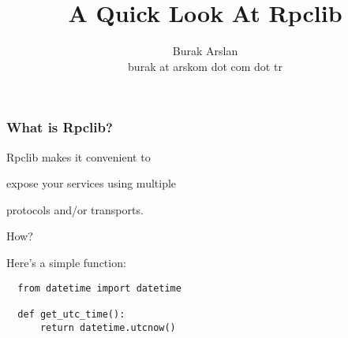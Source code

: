 \documentclass{beamer}
\title{A Quick Look At Rpclib}
\author{Burak Arslan \\ \small burak at arskom \small{dot} com \small{dot} tr}
\begin{document}
\begin{frame}
  \maketitle
\end{frame}

\begin{frame}
  \frametitle{What is Rpclib?}

  \LARGE
\begin{center}

  Rpclib makes it convenient to

  \bigskip

  expose your services using multiple

  \bigskip

  protocols and/or transports.

\end{center}


\end{frame}


%
%
%
%
%
%
%
%

\begin{frame}
\Huge
\begin{center}

  How?

\end{center}

\end{frame}

\begin{frame}[fragile]
  \LARGE
\begin{center}

  Here's a simple function:

  \pause

  \bigskip

  \bigskip

  \large

  \begin{lstlisting}
  from datetime import datetime

  def get_utc_time():
      return datetime.utcnow()
  \end{lstlisting}

\end{center}
\end{frame}
\end{document}

